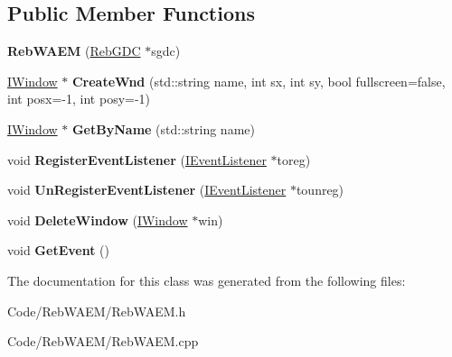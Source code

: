 \subsection*{Public Member Functions}
\begin{DoxyCompactItemize}
\item 
{\bfseries Reb\+W\+A\+EM} (\hyperlink{class_reb_g_d_c}{Reb\+G\+DC} $\ast$sgdc)\hypertarget{class_reb_w_a_e_m_a99a1b11b1f3f77ae9ddee2d717f7b8e6}{}\label{class_reb_w_a_e_m_a99a1b11b1f3f77ae9ddee2d717f7b8e6}

\item 
\hyperlink{class_i_window}{I\+Window} $\ast$ {\bfseries Create\+Wnd} (std\+::string name, int sx, int sy, bool fullscreen=false, int posx=-\/1, int posy=-\/1)\hypertarget{class_reb_w_a_e_m_a3ea64b6a8c6b4c324c7e20bb3b1eb1a8}{}\label{class_reb_w_a_e_m_a3ea64b6a8c6b4c324c7e20bb3b1eb1a8}

\item 
\hyperlink{class_i_window}{I\+Window} $\ast$ {\bfseries Get\+By\+Name} (std\+::string name)\hypertarget{class_reb_w_a_e_m_a2e5cf13eca629b9cc897efca72a33d65}{}\label{class_reb_w_a_e_m_a2e5cf13eca629b9cc897efca72a33d65}

\item 
void {\bfseries Register\+Event\+Listener} (\hyperlink{class_i_event_listener}{I\+Event\+Listener} $\ast$toreg)\hypertarget{class_reb_w_a_e_m_a6a3d76d7046bf4112f614e8f2624933d}{}\label{class_reb_w_a_e_m_a6a3d76d7046bf4112f614e8f2624933d}

\item 
void {\bfseries Un\+Register\+Event\+Listener} (\hyperlink{class_i_event_listener}{I\+Event\+Listener} $\ast$tounreg)\hypertarget{class_reb_w_a_e_m_a4ae4068f428549240cbf0264e47f9daf}{}\label{class_reb_w_a_e_m_a4ae4068f428549240cbf0264e47f9daf}

\item 
void {\bfseries Delete\+Window} (\hyperlink{class_i_window}{I\+Window} $\ast$win)\hypertarget{class_reb_w_a_e_m_a38f6c040847cf10e09de0dee1a2be35b}{}\label{class_reb_w_a_e_m_a38f6c040847cf10e09de0dee1a2be35b}

\item 
void {\bfseries Get\+Event} ()\hypertarget{class_reb_w_a_e_m_afdc61c1bba50526d78e16bf91d3fa18c}{}\label{class_reb_w_a_e_m_afdc61c1bba50526d78e16bf91d3fa18c}

\end{DoxyCompactItemize}


The documentation for this class was generated from the following files\+:\begin{DoxyCompactItemize}
\item 
Code/\+Reb\+W\+A\+E\+M/Reb\+W\+A\+E\+M.\+h\item 
Code/\+Reb\+W\+A\+E\+M/Reb\+W\+A\+E\+M.\+cpp\end{DoxyCompactItemize}

